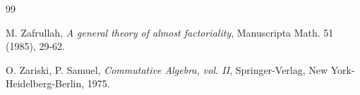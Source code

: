 \documentclass[10pt]{article}
\numberwithin{equation}{section}
\theoremstyle{definition}
\theoremstyle{definition}
\begin{document}
\begin{thebibliography}{99}


  M. Zafrullah, {\em A general theory of almost factoriality}, Manuscripta Math. 51 (1985), 29-62.

 O. Zariski, P. Samuel, \emph{Commutative Algebra, vol. II}, Springer-Verlag, New York-Heidelberg-Berlin, 1975.

\end{thebibliography}
\end{document}
